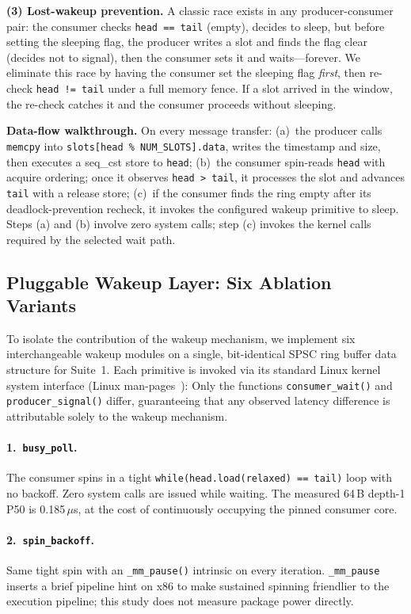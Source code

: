 \documentclass[10pt,conference]{IEEEtran}
\begin{document}
\textbf{(3) Lost-wakeup prevention.}  A classic race exists in any
producer-consumer pair: the consumer checks \texttt{head == tail}
(empty), decides to sleep, but before setting
the sleeping flag, the producer writes a slot and finds the flag clear
(decides not to signal), then the consumer sets it and waits---forever.
We eliminate this race by having the consumer set
the sleeping flag \emph{first}, then re-check
\texttt{head~!=~tail} under a full memory fence.  If a slot arrived in
the window, the re-check catches it and the consumer proceeds without
sleeping.

\textbf{Data-flow walkthrough.}  On every message transfer: (a)~the producer
calls \texttt{memcpy} into \texttt{slots[head \% NUM\_SLOTS].data}, writes the
timestamp and size, then executes a seq\_cst store to \texttt{head};
(b)~the consumer spin-reads \texttt{head} with acquire ordering; once it
observes \texttt{head > tail}, it processes the slot and advances \texttt{tail}
with a release store; (c)~if the consumer finds the ring empty after its
deadlock-prevention recheck, it invokes the configured wakeup primitive to
sleep.  Steps (a) and (b) involve zero system calls; step (c) invokes the
kernel calls required by the selected wait path.

\subsection{Pluggable Wakeup Layer: Six Ablation Variants}

To isolate the contribution of the wakeup mechanism, we implement six
interchangeable wakeup modules on a single, bit-identical SPSC ring buffer data
structure for Suite~1.  Each primitive is invoked via its standard Linux kernel system
interface (Linux man-pages~\cite{linux-man}): Only the
functions \texttt{consumer\_wait()} and \texttt{producer\_signal()} differ,
guaranteeing that any observed latency difference is attributable solely to
the wakeup mechanism.

\paragraph{1.~\texttt{busy\_poll}.}
The consumer spins in a tight \texttt{while(head.load(relaxed) == tail)} loop
with no backoff.  Zero system calls are issued while waiting.  The measured
64\,B depth-1 P50 is 0.185\,$\mu$s, at the cost of continuously occupying the
pinned consumer core.

\paragraph{2.~\texttt{spin\_backoff}.}
Same tight spin with an \texttt{\_mm\_pause()} intrinsic on every iteration.
\texttt{\_mm\_pause} inserts a brief pipeline hint on x86 to make sustained
spinning friendlier to the execution pipeline; this study does not measure
package power directly.
\end{document}
